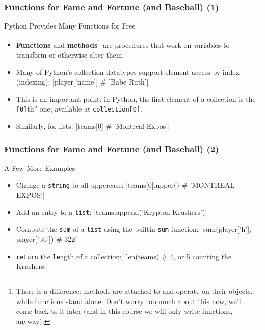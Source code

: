 \documentclass[10pt]{beamer}
\begin{document}
\begin{frame}[fragile]
  \frametitle{Functions for Fame and Fortune (and Baseball) (1)}
  \begin{block}{Python Provides Many Functions for Free}
    \begin{itemize}
      \item \textbf{Functions} and \textbf{methods}\footnote{There is a difference: methods are attached to and operate on their objects, while functions stand alone. Don't worry too much about this now, we'll come back to it later (and in this course we will only write functions, anyway).} are procedures that work on variables to transform or otherwise alter them.
      \item Many of Python's collection datatypes support element access by index (indexing):
        |player['name'] # 'Babe Ruth'|

      \item This is an important point: in Python, the first element of a collection is the \texttt{[0]}th'' one, available at \texttt{collection[0]}.
      \item Similarly, for lists:
        |teams[0] # 'Montreal Expos'|
    \end{itemize}
  \end{block}
\end{frame}

\begin{frame}[fragile]
  \frametitle{Functions for Fame and Fortune (and Baseball) (2)}
  \begin{block}{A Few More Examples}
    \begin{itemize}
      \item Change a \texttt{string} to all uppercase:
        |teams[0].upper() # 'MONTREAL EXPOS'|
      \item Add an entry to a \texttt{list}:
        |teams.append('Krypton Krushers')|
      \item Compute the \texttt{sum} of a \texttt{list} using the builtin \texttt{sum} function:
        |sum(player['h'], player['bb']) # 322|
      \item \texttt{return} the \texttt{len}gth of a collection:
        |len(teams) # 4, or 5 counting the Krushers.|
    \end{itemize}
  \end{block}
\end{frame}
\end{document}
